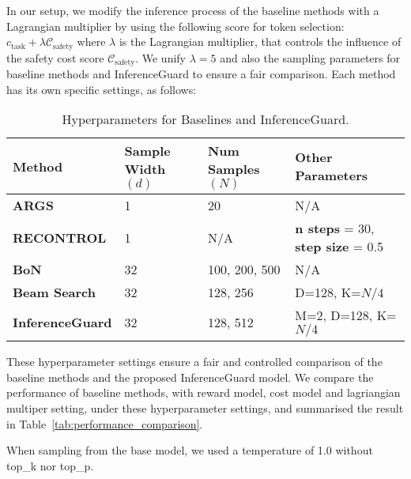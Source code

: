 In our setup, we modify the inference process of the baseline methods with a Lagrangian multiplier by using the following score for token selection: $c_{\text{task}} + \lambda \mathcal{C}_{\text{safety}}$
where $\lambda$ is the Lagrangian multiplier, that controls the influence of the safety cost score $\mathcal{C}_{\text{safety}}$. We unify $\lambda = 5$ and also the sampling parameters for baseline methods and InferenceGuard to ensure a fair comparison. Each method has its own specific settings, as follows:

\begin{table}[ht]
\centering
\begin{tabular}{l|l|l|l}
\toprule
\textbf{Method} & \textbf{Sample Width} $(d)$ & \textbf{Num Samples} $(N)$ & \textbf{Other Parameters} \\
\midrule
\textbf{ARGS} & 1 & 20 & N/A \\
\textbf{RECONTROL} & 1 & N/A & \textbf{n steps} = 30, \textbf{step size} = 0.5 \\
\textbf{BoN} & 32 & 100, 200, 500 & N/A \\
\textbf{Beam Search} & 32 & 128, 256 & D=128, K=$N/4$ \\
\textbf{InferenceGuard} & 32 & 128, 512 & M=2, D=128, K=$N/4$ \\
\bottomrule
\end{tabular}
\caption{Hyperparameters for Baselines and InferenceGuard.}
\label{tab:hyperparameters}
\end{table}


These hyperparameter settings ensure a fair and controlled comparison of the baseline methods and the proposed InferenceGuard model. We compare the performance of baseline methods, with reward model, cost model and lagriangian multiper setting, under these hyperparameter settings, and summarised the result in Table~\ref{tab:performance_comparison}.

When sampling from the base model, we used a temperature of 1.0 without top\_k nor top\_p.


